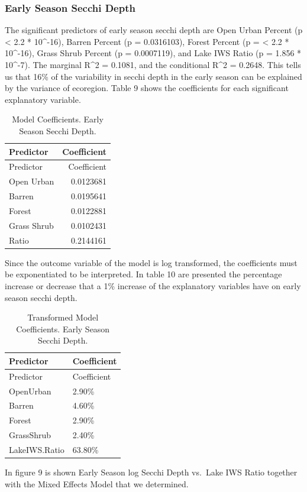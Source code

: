 \documentclass[12pt,]{article}
\begin{document}
\hypertarget{early-season-secchi-depth}{%
\subsubsection{Early Season Secchi
Depth}\label{early-season-secchi-depth}}

The significant predictors of early season secchi depth are Open Urban
Percent (p \textless{} 2.2 * 10\^{}-16), Barren Percent (p = 0.0316103),
Forest Percent (p = \textless{} 2.2 * 10\^{}-16), Grass Shrub Percent (p
= 0.0007119), and Lake IWS Ratio (p = 1.856 * 10\^{}-7). The marginal
R\^{}2 = 0.1081, and the conditional R\^{}2 = 0.2648. This tells us that
16\% of the variability in secchi depth in the early season can be
explained by the variance of ecoregion. Table 9 shows the coefficients
for each significant explanatory variable.

\begin{longtable}[]{@{}lr@{}}
\caption{Model Coefficients. Early Season Secchi Depth.}\tabularnewline
\toprule
Predictor & Coefficient\tabularnewline
\midrule
\endfirsthead
\toprule
Predictor & Coefficient\tabularnewline
\midrule
\endhead
Open Urban & 0.0123681\tabularnewline
Barren & 0.0195641\tabularnewline
Forest & 0.0122881\tabularnewline
Grass Shrub & 0.0102431\tabularnewline
Ratio & 0.2144161\tabularnewline
\bottomrule
\end{longtable}

Since the outcome variable of the model is log transformed, the
coefficients must be exponentiated to be interpreted. In table 10 are
presented the percentage increase or decrease that a 1\% increase of the
explanatory variables have on early season secchi depth.

\begin{longtable}[]{@{}ll@{}}
\caption{Transformed Model Coefficients. Early Season Secchi
Depth.}\tabularnewline
\toprule
Predictor & Coefficient\tabularnewline
\midrule
\endfirsthead
\toprule
Predictor & Coefficient\tabularnewline
\midrule
\endhead
OpenUrban & 2.90\%\tabularnewline
Barren & 4.60\%\tabularnewline
Forest & 2.90\%\tabularnewline
GrassShrub & 2.40\%\tabularnewline
LakeIWS.Ratio & 63.80\%\tabularnewline
\bottomrule
\end{longtable}

In figure 9 is shown Early Season log Secchi Depth vs.~Lake IWS Ratio
together with the Mixed Effects Model that we determined.
\end{document}
